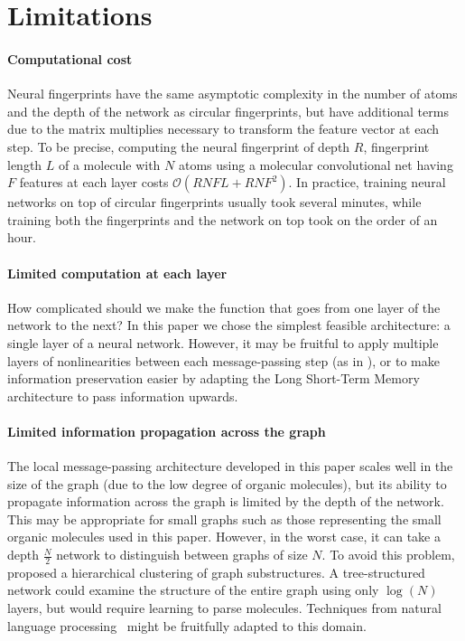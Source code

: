 \documentclass{article}
\newcommand{\citep}{\cite}
\newcommand{\citet}{\cite}
\begin{document}
\section{Limitations}

\paragraph{Computational cost}
Neural fingerprints have the same asymptotic complexity in the number of atoms and the depth of the network as circular fingerprints, but have additional terms due to the matrix multiplies necessary to transform the feature vector at each step.
To be precise, computing the neural fingerprint of depth $R$, fingerprint length $L$ of a molecule with $N$ atoms using a molecular convolutional net having $F$ features at each layer costs $\mathcal{O}(RNFL + RNF^2)$.
In practice, training neural networks on top of circular fingerprints usually took several minutes, while training both the fingerprints and the network on top took on the order of an hour.

\paragraph{Limited computation at each layer}
How complicated should we make the function that goes from one layer of the network to the next?
In this paper we chose the simplest feasible architecture: a single layer of a neural network.
However, it may be fruitful to apply multiple layers of nonlinearities between each message-passing step (as in \cite{graphnn2009}), or to make information preservation easier by adapting the Long Short-Term Memory~\citep{hochreiter1997long} architecture to pass information upwards.

\paragraph{Limited information propagation across the graph}
The local message-passing architecture developed in this paper scales well in the size of the graph (due to the low degree of organic molecules), but its ability to propagate information across the graph is limited by the depth of the network.
This may be appropriate for small graphs such as those representing the small organic molecules used in this paper.
However, in the worst case, it can take a depth $\frac{N}{2}$ network to distinguish between graphs of size $N$.
To avoid this problem, \citet{bruna2013spectral} proposed a hierarchical clustering of graph substructures.
A tree-structured network could examine the structure of the entire graph using only $\log(N)$ layers, but would require learning to parse molecules.
Techniques from natural language processing~\citep{tai2015improved} might be fruitfully adapted to this domain.
\end{document}
